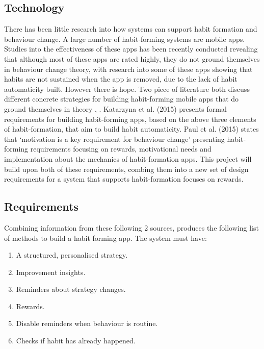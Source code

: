 \subsection{Technology}
There has been little research into how systems can support habit formation and behaviour change. A large number of habit-forming systems are mobile apps. Studies into the effectiveness of these apps has been recently conducted \cite{article_beyond_self_tracking_designing_apps} revealing that although most of these apps are rated highly, they do not ground themselves in behaviour change theory, with research into some of these apps showing that habits are not sustained when the app is removed, due to the lack of habit automaticity built.\newline
\newline
However there is hope. Two piece of literature both discuss different concrete strategies for building habit-forming mobile apps that do ground themselves in theory \cite{article_beyond_self_tracking_designing_apps}, \cite{article_taxonomy_motivational_affordances_meaningful}. Katarzyna et al. (2015) presents formal requirements for building habit-forming apps, based on the above three elements of habit-formation, that aim to build habit automaticity. Paul et al. (2015) states that `motivation is a key requirement for behaviour change' presenting habit-forming requirements focusing on rewards, motivational needs and implementation about the mechanics of habit-formation apps. This project will build upon both of these requirements, combing them into a new set of design requirements for a system that supports habit-formation focuses on rewards.

\subsection{Requirements}
Combining information from these following 2 sources, produces the following list of methods to build a habit forming app.\newline
\newline
The system must have:

\begin{enumerate}
  \item A structured, personalised strategy.
  \item Improvement insights.
  \item Reminders about strategy changes.
  \item Rewards.
  \item Disable reminders when behaviour is routine.
  \item Checks if habit has already happened.
\end{enumerate}

